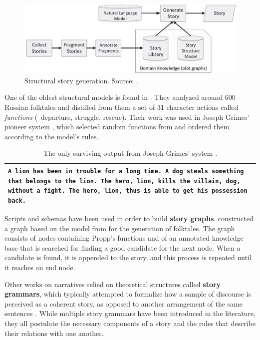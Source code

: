 \begin{figure}
    \centering
    \includegraphics[width=\columnwidth]{pictures/structural_models.jpg}
    \caption{Structural story generation. Source: \citet{alhussain2021automatic}.}
    \label{fig:structural_story_generation}
\end{figure}

One of the oldest structural models is found in \citet{propp1968morphology}. They analyzed around 600 Russian folktales and distilled from them a set of 31 character actions called \emph{functions} (\eg\ departure, struggle, rescue). Their work was used in Joseph Grimes' pioneer system \citep{ryan2017grimes}, which selected random functions from \citet{propp1968morphology} and ordered them according to the model's rules.

\begin{table}
    \centering
    \begin{tabular}{p{}}
        \toprule
        \texttt{A lion has been in trouble for a long time. A dog steals something that belongs to the lion. The hero, lion, kills the villain, dog, without a fight. The hero, lion, thus is able to get his possession back.}\\
        \bottomrule
    \end{tabular}
    \caption{The only surviving output from Joseph Grimes' system \citep{ryan2017grimes}.}
    \label{tab:grimes}
\end{table}

Scripts and schemas have been used in order to build \textbf{story graphs}. \citet{maranda1985semiography} constructed a graph based on the model from \citet{propp1968morphology} for the generation of folktales. The graph consists of nodes containing Propp's functions and of an annotated knowledge base that is searched for finding a good candidate for the next node. When a candidate is found, it is appended to the story, and this process is repeated until it reaches an end node.

Other works on narratives relied on theoretical structures called \textbf{story grammars}, which typically attempted to formalize how a sample of discourse is perceived as a coherent story, as opposed to another arrangement of the same sentences \citep{brewer1980event}. While multiple story grammars have been introduced in the literature, they all postulate the necessary components of a story and the rules that describe their relations with one another.

